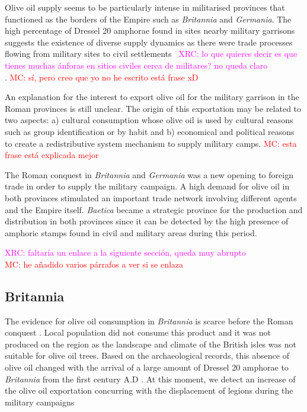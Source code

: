 \documentclass[review]{elsarticle}
\newcommand{\memo}[2]{\textcolor{#1}{#2}}
\newcommand{\maria}[1]{\memo{red}{MC: #1\\}}
\newcommand{\xavi}[1]{\memo{magenta}{XRC: #1\\}}
\begin{document}
Olive oil supply seems to be particularly intense in militarised provinces that functioned as the borders of the Empire such as \textit{Britannia} and \textit{Germania}. The high percentage of Dressel 20 amphorae found in sites nearby military garrisons suggests the existence of diverse supply dynamics as there were trade processes flowing from military sites to civil settlements~\citep{remesal_annona_1986, carreras_britannia_1998}
\xavi{lo que quieres decir es que tienes muchas ánforas en sitios civiles cerca de militares? no queda claro}.
\maria{sí, pero creo que yo no he escrito está frase xD}

An explanation for the interest to export olive oil for the military garrison in the Roman provinces is still unclear. The origin of this exportation may be related to two aspects: a) cultural consumption whose olive oil is used by cultural reasons such as group identification or by habit and b) economical and political reasons to create a redistributive system mechanism to supply military camps. 
\maria{esta frase está explicada mejor}


The Roman conquest in \textit{Britannia} and \textit{Germania} was a new opening to foreign trade in order to supply the military campaign. A high demand for olive oil in both provinces stimulated an important trade network involving different agents and the Empire itself. \textit{Baetica} became a strategic province for the production and distribution in both provinces since it can be detected by the high presence of amphoric stamps found in civil and military areas during this period. 

\xavi{faltaría un enlace a la siguiente sección, queda muy abrupto}
\maria{he añadido varios párrafos a ver si se enlaza}


\subsection{Britannia}

The evidence for olive oil consumption in \textit{Britannia} is scarce before the Roman conquest \citep{funari_corpus_1996,carreras_abastecimiento_2003}. Local population did not consume this product and it was not produced on the region as the landscape and climate of the British isles was not suitable for olive oil trees\citep[161]{monfort_britanniaen_1998}. Based on the archaeological records, this absence of olive oil changed with the arrival of a large amount of Dressel 20 amphorae to \textit{Britannia} from the first century A.D \citep{peacock_amphorae_1991,
carreras_britannia_1998}. At this moment, we detect an increase of the olive oil exportation concurring with the displacement of legions during the military campaigns \citep[161]{monfort_britanniaen_1998}
\end{document}
